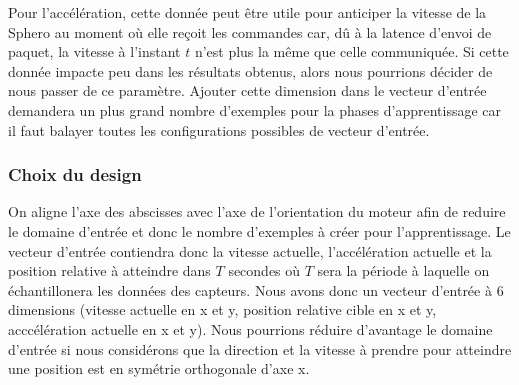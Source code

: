 Pour l'accélération, cette donnée peut être utile pour anticiper la vitesse de la Sphero au moment où elle reçoit les commandes car, dû à la latence d'envoi de paquet, la vitesse à l'instant $t$ n'est plus la même que celle communiquée.
Si cette donnée impacte peu dans les résultats obtenus, alors nous pourrions décider de nous passer de ce paramètre.
Ajouter cette dimension dans le vecteur d'entrée demandera un plus grand nombre d'exemples pour la phases d'apprentissage car il faut balayer toutes les configurations possibles de vecteur d'entrée.

\newcommand{\inchist}[1]{
 \begin{minipage}{0.48\textwidth}
  \texttt{[image: ../figures/perf\#1.png]}
 \end{minipage}
}
\newcommand{\incbefore}[1]{
 \begin{minipage}{0.48\textwidth}
  \texttt{[image: ../figures/perf\#1Before.png]}
 \end{minipage}
}
\subsubsection{Choix du design}\label{sec:choixdesign}
On aligne l'axe des abscisses avec l'axe de l'orientation du moteur afin de reduire le domaine d'entrée et donc le nombre d'exemples à créer pour l'apprentissage.
Le vecteur d'entrée contiendra donc la vitesse actuelle, l'accélération actuelle et la position relative à atteindre dans $T$ secondes où $T$ sera la période à laquelle on échantillonera les données des capteurs.
Nous avons donc un vecteur d'entrée à 6 dimensions (vitesse actuelle en x et y, position relative cible en x et y, acccélération actuelle en x et y).
Nous pourrions réduire d'avantage le domaine d'entrée si nous considérons que la direction et la vitesse à prendre pour atteindre une position est en symétrie orthogonale d'axe x.

